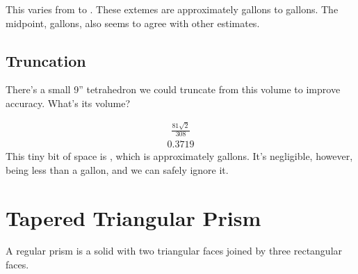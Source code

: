 \documentclass[letterpaper,10pt,english]{sphinxmanual}
\begin{document}
\sphinxAtStartPar
This varies from  to .
These extemes are approximately  gallons to  gallons.
The midpoint,  gallons, also seems to agree with other estimates.


\subsection{Truncation}
\label{\detokenize{tetrahedron:truncation}}
\sphinxAtStartPar
There’s a small 9” tetrahedron we could truncate from this volume to improve accuracy. What’s its volume?

\begin{sphinxVerbatim}[commandchars=\\\{\}]
        
\end{sphinxVerbatim}

\begin{sphinxVerbatim}[commandchars=\\\{\}]
 
 
\end{sphinxVerbatim}
\begin{equation*}
\begin{split}\displaystyle \frac{81 \sqrt{2}}{308}\end{split}
\end{equation*}\begin{equation*}
\begin{split}\displaystyle 0.3719\end{split}
\end{equation*}
\sphinxAtStartPar
This tiny bit of space is , which is approximately  gallons.
It’s negligible, however, being less than a gallon, and we can safely ignore it.


\section{Tapered Triangular Prism}
\label{\detokenize{prism-irregular:tapered-triangular-prism}}\label{\detokenize{prism-irregular::doc}}
\sphinxAtStartPar
A regular prism is a solid with two triangular faces joined by three rectangular faces.
\end{document}

